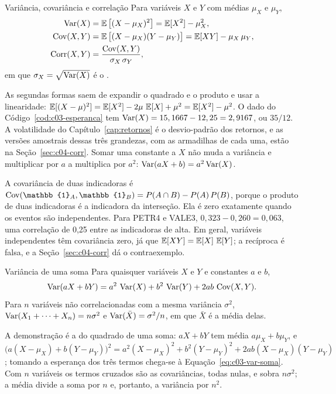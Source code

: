 \begin{definicao}{Variância, covariância e correlação}
Para variáveis $X$ e $Y$ com médias $\mu_X$ e $\mu_Y$,
\begin{equation}
  \begin{aligned}
  \operatorname{Var}(X) &= \operatorname{\mathbb{E}}\big[(X - \mu_X)^2\big] = \operatorname{\mathbb{E}}[X^2] - \mu_X^2 , \\
  \operatorname{Cov}(X, Y) &= \operatorname{\mathbb{E}}\big[(X - \mu_X)(Y - \mu_Y)\big] = \operatorname{\mathbb{E}}[XY] - \mu_X\,\mu_Y , \\
  \operatorname{Corr}(X, Y) &= \frac{\operatorname{Cov}(X, Y)}{\sigma_X\,\sigma_Y} ,
  \end{aligned}
  \label{eq:c03-var}
\end{equation}
em que $\sigma_X = \sqrt{\operatorname{Var}(X)}$ é o .
\end{definicao}

As segundas formas saem de expandir o quadrado e o produto e usar a linearidade: $\operatorname{\mathbb{E}}[(X-\mu)^2] = \operatorname{\mathbb{E}}[X^2] - 2\mu\,\operatorname{\mathbb{E}}[X] + \mu^2 = \operatorname{\mathbb{E}}[X^2] - \mu^2$. O dado do Código~\ref{cod:c03-esperanca} tem $\operatorname{Var}(X) = 15,1667 - 12,25 = 2,9167$, ou $35/12$. A volatilidade do Capítulo~\ref{cap:retornos} é o desvio-padrão dos retornos, e as versões amostrais dessas três grandezas, com as armadilhas de cada uma, estão na Seção~\ref{sec:c04-corr}. Somar uma constante a $X$ não muda a variância e multiplicar por $a$ a multiplica por $a^2$: $\operatorname{Var}(aX + b) = a^2 \operatorname{Var}(X)$.

A covariância de duas indicadoras é $\Cov(\mathbb{1}_A, \mathbb{1}_B) = P(A \cap B) - P(A)\,P(B)$, porque o produto de duas indicadoras é a indicadora da interseção. Ela é zero exatamente quando os eventos são independentes. Para PETR4 e VALE3, $0,323 - 0,260 = 0,063$, uma correlação de 0,25 entre as indicadoras de alta. Em geral, variáveis independentes têm covariância zero, já que $\operatorname{\mathbb{E}}[XY] = \operatorname{\mathbb{E}}[X]\,\operatorname{\mathbb{E}}[Y]$; a recíproca é falsa, e a Seção~\ref{sec:c04-corr} dá o contraexemplo.

\begin{resultado}{Variância de uma soma}
Para quaisquer variáveis $X$ e $Y$ e constantes $a$ e $b$,
\begin{equation}
  \operatorname{Var}(aX + bY) = a^2\,\operatorname{Var}(X) + b^2\,\operatorname{Var}(Y) + 2ab\,\operatorname{Cov}(X, Y) .
  \label{eq:c03-var-soma}
\end{equation}
Para $n$ variáveis não correlacionadas com a mesma variância $\sigma^2$, $\operatorname{Var}(X_1 + \dots + X_n) = n\sigma^2$ e $\operatorname{Var}(\bar X) = \sigma^2/n$, em que $\bar X$ é a média delas.
\end{resultado}

A demonstração é a do quadrado de uma soma: $aX + bY$ tem média $a\mu_X + b\mu_Y$, e
$\big(a(X - \mu_X) + b(Y - \mu_Y)\big)^2 = a^2(X-\mu_X)^2 + b^2(Y-\mu_Y)^2 + 2ab(X-\mu_X)(Y-\mu_Y)$; tomando a esperança dos três termos chega-se à Equação~\eqref{eq:c03-var-soma}. Com $n$ variáveis os termos cruzados são as covariâncias, todas nulas, e sobra $n\sigma^2$; a média divide a soma por $n$ e, portanto, a variância por $n^2$.

